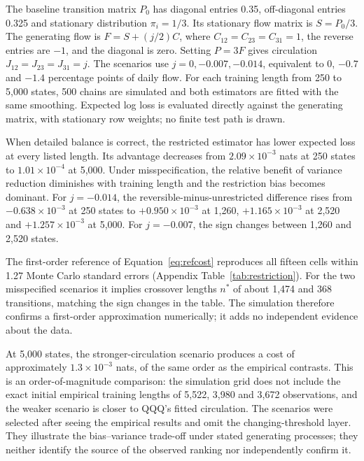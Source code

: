 The baseline transition matrix $P_0$ has diagonal entries 0.35, off-diagonal entries 0.325 and stationary distribution $\pi_i=1/3$. Its stationary flow matrix is $S=P_0/3$. The generating flow is $F=S+(j/2)C$, where $C_{12}=C_{23}=C_{31}=1$, the reverse entries are $-1$, and the diagonal is zero. Setting $P=3F$ gives circulation $J_{12}=J_{23}=J_{31}=j$. The scenarios use $j=0,-0.007,-0.014$, equivalent to 0, $-0.7$ and $-1.4$ percentage points of daily flow. For each training length from 250 to 5,000 states, 500 chains are simulated and both estimators are fitted with the same smoothing. Expected log loss is evaluated directly against the generating matrix, with stationary row weights; no finite test path is drawn.

When detailed balance is correct, the restricted estimator has lower expected loss at every listed length. Its advantage decreases from $2.09\times10^{-3}$ nats at 250 states to $1.01\times10^{-4}$ at 5,000. Under misspecification, the relative benefit of variance reduction diminishes with training length and the restriction bias becomes dominant. For $j=-0.014$, the reversible-minus-unrestricted difference rises from $-0.638\times10^{-3}$ at 250 states to $+0.950\times10^{-3}$ at 1,260, $+1.165\times10^{-3}$ at 2,520 and $+1.257\times10^{-3}$ at 5,000. For $j=-0.007$, the sign changes between 1,260 and 2,520 states.

The first-order reference of Equation~\eqref{eq:refcost} reproduces all fifteen cells within 1.27 Monte Carlo standard errors (Appendix Table~\ref{tab:restriction}). For the two misspecified scenarios it implies crossover lengths $n^\ast$ of about 1,474 and 368 transitions, matching the sign changes in the table. The simulation therefore confirms a first-order approximation numerically; it adds no independent evidence about the data.

At 5,000 states, the stronger-circulation scenario produces a cost of approximately $1.3\times10^{-3}$ nats, of the same order as the empirical contrasts. This is an order-of-magnitude comparison: the simulation grid does not include the exact initial empirical training lengths of 5,522, 3,980 and 3,672 observations, and the weaker scenario is closer to QQQ's fitted circulation. The scenarios were selected after seeing the empirical results and omit the changing-threshold layer. They illustrate the bias--variance trade-off under stated generating processes; they neither identify the source of the observed ranking nor independently confirm it.

